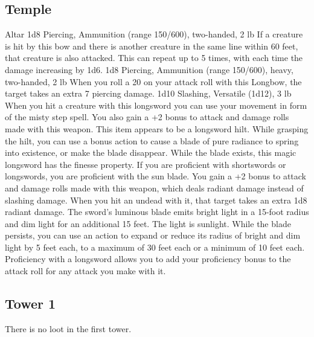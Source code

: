 \documentclass[a4paper,10pt,twoside,twocolumn,bg=print]{dndbook} %
\begin{document}
		\subsection{Temple}
			{\Large Altar}
					1d8 Piercing, Ammunition (range 150/600), two-handed, 2 lb\linebreak
					If a creature is hit by this bow and there is another creature in the same line within 60 feet, that creature is also attacked. This can repeat up to 5 times, with each time the damage increasing by 1d6.
					1d8 Piercing, Ammunition (range 150/600), heavy, two-handed, 2 lb\linebreak
					When you roll a 20 on your attack roll with this Longbow, the target takes an extra 7 piercing damage.
					1d10 Slashing, Versatile (1d12), 3 lb\linebreak
					When you hit a creature with this longsword you can use your movement in form of the misty step spell. You also gain a +2  bonus to attack and damage rolls made with this weapon.
					This item appears to be a longsword hilt. While grasping the hilt, you can use a bonus action to cause a blade of pure radiance to spring into existence, or make the blade disappear. While the blade exists, this magic longsword has the finesse property. If you are proficient with shortswords or longswords, you are proficient with the sun blade.\linebreak
					You gain a +2 bonus to attack and damage rolls made with this weapon, which deals radiant damage instead of slashing damage. When you hit an undead with it, that target takes an extra 1d8 radiant damage.\linebreak
					The sword's luminous blade emits bright light in a 15-foot radius and dim light for an additional 15 feet. The light is sunlight. While the blade persists, you can use an action to expand or reduce its radius of bright and dim light by 5 feet each, to a maximum of 30 feet each or a minimum of 10 feet each.\linebreak
					Proficiency with a longsword allows you to add your proficiency bonus to the attack roll for any attack you make with it.
		\subsection{Tower 1}
			There is no loot in the first tower.
			\vfill\pagebreak
\end{document}
